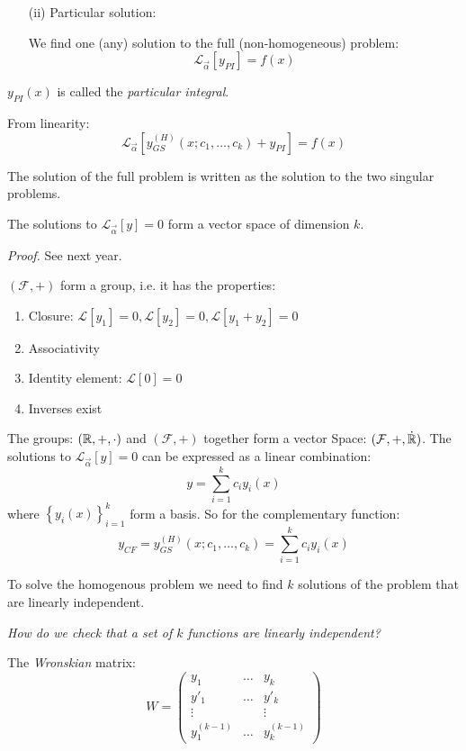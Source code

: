 \documentclass[10pt]{scrartcl}
\begin{document}
\begin{enumerate}
  \item[(ii)] Particular solution: 
  
  We find one (any) solution to the full (non-homogeneous) problem:
    \[\mathcal{L}_{\vec{\alpha}}[y_{PI}] = f(x)\]
    
\end{enumerate}  

    
\begin{definition}
  $y_{PI}(x)$ is called the \emph{particular integral}.
  \end{definition}
 
  From linearity: 
  \[\mathcal{L}_{\vec{\alpha}}[y_{GS}^{(H)}(x;c_1,\dots,c_k)+y_{PI}] = f(x)\]
  
  The solution of the full problem is written as the solution to the two singular problems. 

\begin{theorem}
The solutions to $\mathcal{L}_{\vec{\alpha}}[y]=0$ form a vector space of dimension $k$. 	
\end{theorem}
\textit{Proof.} See next year. 

$(\mathcal{F}, +)$ form a group, i.e. it has the properties:
\begin{enumerate}
  \item Closure: $\mathcal{L}[y_1] = 0, \mathcal{L}[y_2] = 0, \mathcal{L}[y_1 + y_2] = 0$
  \item Associativity
  \item Identity element: $\mathcal{L}[0] = 0$
  \item Inverses exist
\end{enumerate}

The groups: $(\mathbb{R}, +, \cdot)$ and $(\mathcal{F}, +)$ together form a vector Space: $(\mathcal{F},+,\dot{\mathbb{R}})$. The solutions to $\mathcal{L}_{\vec{\alpha}}[y] = 0$ can be expressed as a linear combination:
\[y = \sum_{i=1}^kc_iy_i(x)\]
where $\left\{y_i(x)\right\}_{i=1}^k$ form a basis. So for the complementary function:
\[y_{CF} = y_{GS}^{(H)}(x;c_1,\dots,c_k) = \sum_{i=1}^kc_iy_i(x)\]

To solve the homogenous problem we need to find $k$ solutions of the problem that are linearly independent. 

\emph{How do we check that a set of $k$ functions are linearly independent?}\\

\begin{definition}
The \emph{Wronskian} matrix:
\[W = 
\begin{pmatrix}
y_1 & \dots & y_k\\
y'_1 & \dots & y'_k\\
\vdots & & \vdots\\
y^{(k-1)}_1 & \dots & y^{(k-1)}_k	
\end{pmatrix}
\]	
\end{definition}
\end{document}
